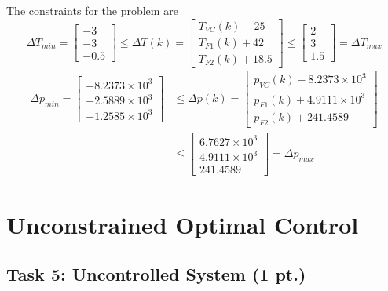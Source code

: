 \documentclass[a4paper,twoside,11pt]{article}
\numberwithin{equation}{section}
\begin{document}
The constraints for the problem are
\begin{equation}
    \Delta T_{min} = 
    \begin{bmatrix}
    -3\\
    -3\\
    -0.5
    \end{bmatrix}
    \leq
    \Delta T(k) = 
    \begin{bmatrix}
    T_{VC}(k) - 25\\
    T_{F1}(k) + 42\\
    T_{F2}(k) + 18.5
    \end{bmatrix}
    \leq
    \begin{bmatrix}
    2\\
    3\\
    1.5
    \end{bmatrix}
     = \Delta T_{max}
\end{equation}
\begin{equation}
\begin{split}
    \Delta p_{min} = 
    \begin{bmatrix}
    -8.2373\times10^{3} \\
    -2.5889\times10^{3} \\
    -1.2585\times10^{3}
    \end{bmatrix}
    &\leq
    \Delta p(k) = 
    \begin{bmatrix}
    p_{VC}(k) - 8.2373\times10^{3}\\
    p_{F1}(k) + 4.9111\times10^{3}\\
    p_{F2}(k) + 241.4589
    \end{bmatrix}\\
    &\leq
    \begin{bmatrix}
    6.7627\times10^{3} \\
    4.9111\times10^{3} \\  
    241.4589
    \end{bmatrix}
     = \Delta p_{max}
\end{split}
\end{equation}

\newpage


\section{Unconstrained Optimal Control}

\subsection{Task 5: Uncontrolled System (1 pt.)}
\end{document}
